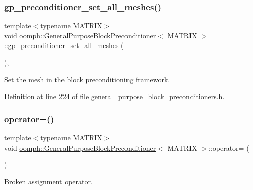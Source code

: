 \subsubsection{\texorpdfstring{gp\+\_\+preconditioner\+\_\+set\+\_\+all\+\_\+meshes()}{gp\_preconditioner\_set\_all\_meshes()}}
{\footnotesize\ttfamily template$<$typename M\+A\+T\+R\+IX$>$ \\
void \hyperlink{classoomph_1_1GeneralPurposeBlockPreconditioner}{oomph\+::\+General\+Purpose\+Block\+Preconditioner}$<$ M\+A\+T\+R\+IX $>$\+::gp\+\_\+preconditioner\+\_\+set\+\_\+all\+\_\+meshes (\begin{DoxyParamCaption}{ }\end{DoxyParamCaption})\hspace{0.3cm}{\ttfamily [inline]}, {\ttfamily [protected]}}



Set the mesh in the block preconditioning framework. 



Definition at line 224 of file general\+\_\+purpose\+\_\+block\+\_\+preconditioners.\+h.

\mbox{\label{classoomph_1_1GeneralPurposeBlockPreconditioner_a5f10bb824b96677f6b481c96831f0a61}} 
\subsubsection{\texorpdfstring{operator=()}{operator=()}}
{\footnotesize\ttfamily template$<$typename M\+A\+T\+R\+IX$>$ \\
void \hyperlink{classoomph_1_1GeneralPurposeBlockPreconditioner}{oomph\+::\+General\+Purpose\+Block\+Preconditioner}$<$ M\+A\+T\+R\+IX $>$\+::operator= (\begin{DoxyParamCaption}\item[{const \hyperlink{classoomph_1_1GeneralPurposeBlockPreconditioner}{General\+Purpose\+Block\+Preconditioner}$<$ M\+A\+T\+R\+IX $>$ \&}]{ }\end{DoxyParamCaption})\hspace{0.3cm}{\ttfamily [inline]}}



Broken assignment operator. 



